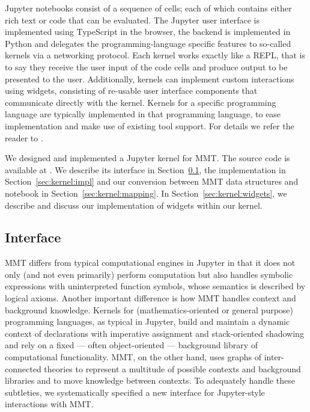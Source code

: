 Jupyter notebooks consist of a sequence of cells; each of which contains either rich text or code that can be evaluated. 
The Jupyter user interface is implemented using TypeScript in the browser, the backend is implemented in Python and delegates the programming-language specific features to so-called kernels via a networking protocol. 
Each kernel works exactly like a REPL, that is to say they receive the user input of the code cells and produce output to be presented to the user. 
Additionally, kernels can implement custom interactions using widgets, consisting of re-usable user interface components that communicate directly with the kernel.  
Kernels for a specific programming language are typically implemented in that programming language, to ease implementation and make use of existing tool support.
For details we refer the reader to \cite{jupyter-doc:on}. 

We designed and implemented a Jupyter kernel for MMT. 
The source code is available at \cite{mmt_jupyter:on}. 
We describe its interface in Section~\ref{sec:kernel:syntax}, the implementation in Section~\ref{sec:kernel:impl} and our conversion between MMT data structures and notebook in Section~\ref{sec:kernel:mapping}.
In Section~\ref{sec:kernel:widgets}, we describe and discuss our implementation of widgets within our kernel. 

\subsection{Interface}\label{sec:kernel:syntax}

MMT differs from typical computational engines in Jupyter in that it does not only (and not even primarily) perform computation but also handles symbolic expressions with uninterpreted function symbols, whose semantics is described by logical axioms.
Another important difference is how MMT handles context and background knowledge.
Kernels for (mathematics-oriented or general purpose) programming languages, as typical in Jupyter, build and maintain a dynamic context of declarations with imperative assignment and stack-oriented shadowing and rely on a fixed --- often object-oriented --- background library of computational functionality.
MMT, on the other hand, uses graphs of inter-connected theories to represent a multitude of possible contexts and background libraries and to move knowledge between contexts.
To adequately handle these subtleties, we systematically specified a new interface for Jupyter-style interactions with MMT.

